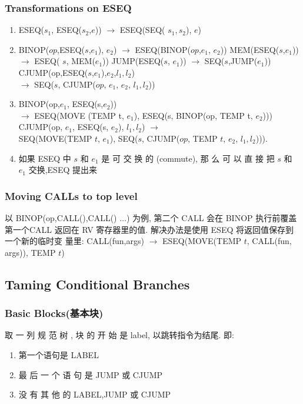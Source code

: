 \subsubsection{Transformations on ESEQ}
\begin{enumerate}
    \item ESEQ($s_1$, ESEQ($s_2$,$e$)) $\to$ ESEQ(SEQ( $s_1,s_2$), $e$) 
    \item BINOP($op$,ESEQ($s$,$e_1$), $e_2$) $\to$ ESEQ(BINOP($op$,$e_1$, $e_2$)) 
    \subitem MEM(ESEQ($s$,$e_1$)) $\to$ ESEQ( $s$, MEM($e_1$)) 
    \subitem JUMP(ESEQ($s$, $e_1$)) $\to$ SEQ($s$,JUMP($e_1$)) 
    \subitem CJUMP(op,ESEQ($s$,$e_1$),$e_2$,$l_1,l_2$)\\
    $\to$ SEQ($s$, CJUMP($op$, $e_1$, $e_2$, $l_1,l_2$)) 
    \item BINOP(op,$e_1$, ESEQ(s,$e_2$)) \\
    $\to$ ESEQ(MOVE (TEMP t, $e_1$), ESEQ(s, BINOP(op, TEMP t, $e_2$))) 
    \subitem CJUMP(op, $e_1$, ESEQ(s, $e_2$), $l_1,l_2$) $\to$ \\
     SEQ(MOVE(TEMP $t$, $e_1$), SEQ($s$, CJUMP($op$, TEMP $t$, $e_2$, $l_1,l_2$))).
     \item 如果 ESEQ 中 $s$ 和 $e_1$ 是 可 交 换 的 (commute), 那 么 可 以 直 接 把 $s$ 和 $e_1$ 交换,ESEQ 提出来
\end{enumerate}

\subsubsection{Moving CALLs to top level}
以 BINOP(op,CALL(),CALL() $\dots$) 为例, 第二个 CALL 会在 BINOP 执行前覆盖第一个CALL 返回在 RV 寄存器里的值. 解决办法是使用 ESEQ 将返回值保存到一个新的临时变 量里: CALL(fun,args) $\to$ ESEQ(MOVE(TEMP $t$, CALL(fun, args)), TEMP $t$)



\subsection{Taming Conditional Branches}
\subsubsection{Basic Blocks(基本块)}
取 一 列 规 范 树 , 块 的 开 始 是 label, 以跳转指令为结尾. 即:
\begin{enumerate}
    \item 第一个语句是 LABEL
    \item 最 后 一 个 语 句 是 JUMP 或 CJUMP
    \item 没 有 其 他 的 LABEL,JUMP 或 CJUMP
\end{enumerate}


